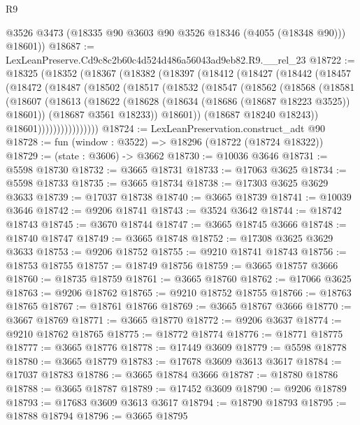 \begin{lexlean}{R9}
\begin{coremodule}
        @3526
        @3473
        (@18335 @90 @3603 @90 @3526 @18346 (@4055 (@18348 @90)))
        @18601))
@18687 := LexLeanPreserve.Cd9c8c2b60c4d524d486a56043ad9eb82.R9.__rel_23
@18722 := @18325
    (@18352
      (@18367
        (@18382
          (@18397
            (@18412
              (@18427
                (@18442
                  (@18457
                    (@18472
                      (@18487
                        (@18502
                          (@18517
                            (@18532
                              (@18547
                                (@18562
                                  (@18568
                                    (@18581
                                      (@18607
                                        (@18613
                                          (@18622
                                            (@18628 (@18634 (@18686 (@18687 @18223 @3525)) @18601))
                                            (@18687 @3561 @18233))
                                          @18601))
                                      (@18687 @18240 @18243))
                                    @18601))))))))))))))))
@18724 := LexLeanPreservation.construct_adt @90
@18728 := fun (window : @3522) => @18296 (@18722 (@18724 @18322))
@18729 := (state : @3606) -> @3662
@18730 := @10036 @3646
@18731 := @5598 @18730
@18732 := @3665 @18731
@18733 := @17063 @3625
@18734 := @5598 @18733
@18735 := @3665 @18734
@18738 := @17303 @3625 @3629 @3633
@18739 := @17037 @18738
@18740 := @3665 @18739
@18741 := @10039 @3646
@18742 := @9206 @18741
@18743 := @3524 @3642
@18744 := @18742 @18743
@18745 := @3670 @18744
@18747 := @3665 @18745 @3666
@18748 := @18740 @18747
@18749 := @3665 @18748
@18752 := @17308 @3625 @3629 @3633
@18753 := @9206 @18752
@18755 := @9210 @18741 @18743
@18756 := @18753 @18755
@18757 := @18749 @18756
@18759 := @3665 @18757 @3666
@18760 := @18735 @18759
@18761 := @3665 @18760
@18762 := @17066 @3625
@18763 := @9206 @18762
@18765 := @9210 @18752 @18755
@18766 := @18763 @18765
@18767 := @18761 @18766
@18769 := @3665 @18767 @3666
@18770 := @3667 @18769
@18771 := @3665 @18770
@18772 := @9206 @3637
@18774 := @9210 @18762 @18765
@18775 := @18772 @18774
@18776 := @18771 @18775
@18777 := @3665 @18776
@18778 := @17449 @3609
@18779 := @5598 @18778
@18780 := @3665 @18779
@18783 := @17678 @3609 @3613 @3617
@18784 := @17037 @18783
@18786 := @3665 @18784 @3666
@18787 := @18780 @18786
@18788 := @3665 @18787
@18789 := @17452 @3609
@18790 := @9206 @18789
@18793 := @17683 @3609 @3613 @3617
@18794 := @18790 @18793
@18795 := @18788 @18794
@18796 := @3665 @18795

\end{coremodule}
\end{lexlean}
